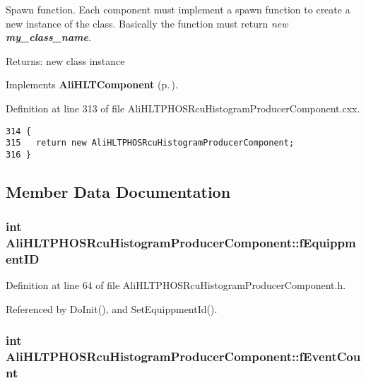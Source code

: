 Spawn function. Each component must implement a spawn function to create a new instance of the class. Basically the function must return {\em new {\bf my\_\-class\_\-name}\/}. \begin{Desc}
\item[Returns:]new class instance \end{Desc}


Implements {\bf Ali\-HLTComponent} {\rm (p.\,\pageref{classAliHLTComponent_a13})}.

Definition at line 313 of file Ali\-HLTPHOSRcu\-Histogram\-Producer\-Component.cxx.

\footnotesize\begin{verbatim}314 {
315   return new AliHLTPHOSRcuHistogramProducerComponent;
316 }
\end{verbatim}\normalsize 




\subsection{Member Data Documentation}
\subsubsection{\setlength{\rightskip}{0pt plus 5cm}int {\bf Ali\-HLTPHOSRcu\-Histogram\-Producer\-Component::f\-Equippment\-ID}\hspace{0.3cm}{\tt  [private]}}\label{classAliHLTPHOSRcuHistogramProducerComponent_r6}




Definition at line 64 of file Ali\-HLTPHOSRcu\-Histogram\-Producer\-Component.h.

Referenced by Do\-Init(), and Set\-Equippment\-Id().
\subsubsection{\setlength{\rightskip}{0pt plus 5cm}int {\bf Ali\-HLTPHOSRcu\-Histogram\-Producer\-Component::f\-Event\-Count}\hspace{0.3cm}{\tt  [private]}}\label{classAliHLTPHOSRcuHistogramProducerComponent_r0}


